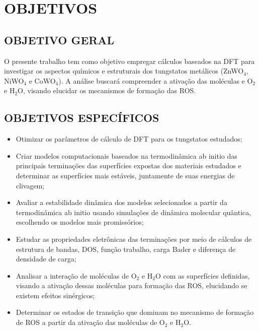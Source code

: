 \chapter{OBJETIVOS}

\section{OBJETIVO GERAL}
O presente trabalho tem como objetivo empregar cálculos baseados na DFT para investigar os aspectos químicos e estruturais dos tungstatos metálicos (ZnWO$_4$, NiWO$_4$ e CoWO$_4$). A análise buscará compreender a ativação das moléculas e O$_2$ e H$_2$O, visando elucidar os mecanismos de formação das ROS.
  
\section{OBJETIVOS ESPECÍFICOS}
\begin{itemize}
  \item Otimizar os parâmetros de cálculo de DFT para os tungstatos estudados;
  \item Criar modelos computacionais baseados na termodinâmica ab initio das principais terminações das superfícies expostas dos materiais estudados e determinar as superfícies mais estáveis, juntamente de suas energias de clivagem;
  \item Avaliar a estabilidade dinâmica dos modelos selecionados a partir da termodinâmica ab initio usando simulações de dinâmica molecular quântica, escolhendo os modelos mais promissórios;
  \item Estudar as propriedades eletrônicas das terminações por meio de cálculos de estrutura de bandas, DOS, função trabalho, carga Bader e diferença de densidade de carga;
  \item Analisar a interação de moléculas de O$_2$ e H$_2$O com as superfícies definidas, visando a ativação dessas moléculas para formação das ROS, elucidando se existem efeitos sinérgicos;
  \item Determinar os estados de transição que dominam no mecanismo de formação de ROS a partir da ativação das moléculas de O$_2$ e H$_2$O.
\end{itemize}



